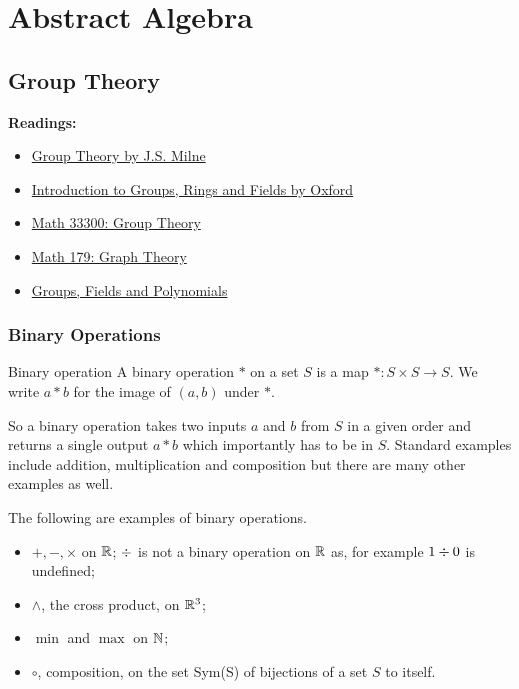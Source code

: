 \part{Abstract Algebra}
\chapter{Group Theory}
\textbf{Readings:}
\begin{itemize}
\item \href{https://www.jmilne.org/math/CourseNotes/GT.pdf}{Group Theory by J.S. Milne}
\item \href{https://people.maths.ox.ac.uk/flynn/genus2/sheets0405/grfnotes1011.pdf}{Introduction to Groups, Rings and Fields by Oxford}
\item \href{https://people.maths.bris.ac.uk/~majm/bib/talks/grouptheory.pdf}{Math 33300: Group Theory}
\item \href{https://web.evanchen.cc/notes/SJSU179.pdf}{Math 179: Graph Theory}
\item \href{https://www.cs.cmu.edu/~15251/notes/polynomials-ecc.pdf}{Groups, Fields and Polynomials}
\end{itemize}

\section{Binary Operations}
\begin{defn}{Binary operation}{}
A binary operation $\ast$ on a set $S$ is a map $\ast: S \times S \to S$. We write $a \ast b$ for the image of $(a, b)$ under $\ast$.
\end{defn}

So a binary operation takes two inputs $a$ and $b$ from $S$ in a given order and returns a single output $a \ast b$ which importantly has to be in $S$. Standard examples include addition, multiplication and
composition but there are many other examples as well.

\begin{exmp}{}{}
The following are examples of binary operations.
\begin{itemize}
\item $+, -, \times$ on $\mathbb R$; $\divisionsymbol$ is not a binary operation on $\mathbb R$ as, for example $1 \divisionsymbol 0$ is undefined;
\item $\wedge$, the cross product, on $\mathbb R^3$;
\item $\min$ and $\max$ on $\mathbb N$;
\item $\circ$, composition, on the set Sym(S) of bijections of a set $S$ to itself.
\end{itemize}
\end{exmp}

